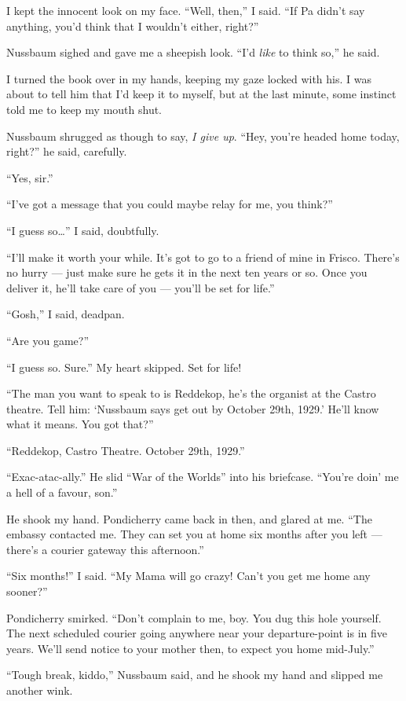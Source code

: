 I kept the innocent look on my face. ``Well, then,'' I said.
``If Pa didn't say anything, you'd think that I wouldn't either, right?''

Nussbaum sighed and gave me a sheepish look.
``I'd \emph{like} to think so,'' he said.

I turned the book over in my hands, keeping my gaze locked with
his. I was about to tell him that I'd keep it to myself, but at the
last minute, some instinct told me to keep my mouth shut.

Nussbaum shrugged as though to say, \emph{I give up}.
``Hey, you're headed home today, right?'' he said, carefully.

``Yes, sir.''

``I've got a message that you could maybe relay for me, you think?''

``I guess so\ldots{}'' I said, doubtfully.

``I'll make it worth your while. It's got to go to a friend of mine in Frisco. 
There's no hurry --- just make sure he gets it in the next ten years or so. 
Once you deliver it, he'll take care of you --- you'll be set for life.''

``Gosh,'' I said, deadpan.

``Are you game?''

``I guess so. Sure.'' My heart skipped. Set for life!

``The man you want to speak to is Reddekop, he's the organist at the Castro 
theatre. Tell him: `Nussbaum says get out by October 29th, 1929.' He'll know 
what it means. You got that?''

``Reddekop, Castro Theatre. October 29th, 1929.''

``Exac-atac-ally.'' He slid ``War of the Worlds'' into his
briefcase. ``You're doin' me a hell of a favour, son.''

He shook my hand. Pondicherry came back in then, and glared at me.
``The embassy contacted me. They can set you at home six months after you left 
--- there's a courier gateway this afternoon.''

``Six months!'' I said.
``My Mama will go crazy! Can't you get me home any sooner?''

Pondicherry smirked.
``Don't complain to me, boy. You dug this hole yourself. The next scheduled 
courier going anywhere near your departure-point is in five years. We'll send 
notice to your mother then, to expect you home mid-July.''

``Tough break, kiddo,'' Nussbaum said, and he shook my hand and
slipped me another wink.

